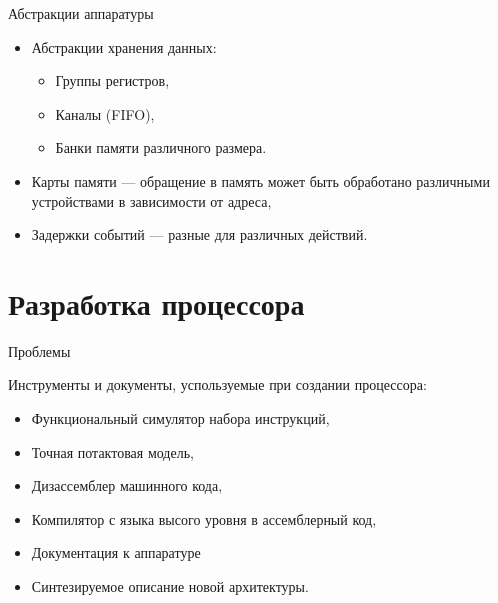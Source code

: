 \begin{frame}{Абстракции аппаратуры}

\begin{itemize}
    \item Абстракции хранения данных:
    \begin{itemize}
        \item Группы регистров,
        \item Каналы (FIFO),
        \item Банки памяти различного размера.
    \end{itemize}
    \item Карты памяти --- обращение в память может быть обработано различными устройствами в зависимости от адреса,
    \item Задержки событий --- разные для различных действий.
\end{itemize}

\end{frame}

\section{Разработка процессора}

\begin{frame}{Проблемы}

Инструменты и документы, успользуемые при создании процессора:

\begin{itemize}
    \item Функциональный симулятор набора инструкций,
    \item Точная потактовая модель,
    \item Дизассемблер машинного кода,
    \item Компилятор с языка высого уровня в ассемблерный код,
    \item Документация к аппаратуре
    \item Синтезируемое описание новой архитектуры.
\end{itemize}

\end{frame}

